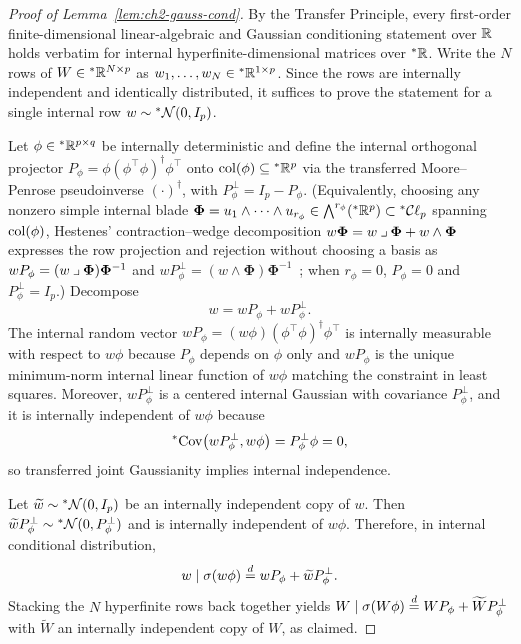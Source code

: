\begin{proof}[Proof of Lemma~\ref{lem:ch2-gauss-cond}]
By the Transfer Principle, every first-order finite-dimensional linear-algebraic and Gaussian conditioning statement over $\mathbb{R}$ holds verbatim for internal hyperfinite-dimensional matrices over ${}^*\mathbb{R}$. Write the $N$ rows of $W \in {}^*\mathbb{R}^{N \times p}$ as $w_1, \dots, w_N \in {}^*\mathbb{R}^{1 \times p}$. Since the rows are internally independent and identically distributed, it suffices to prove the statement for a single internal row $w \sim {}^*\mathcal{N}(0, I_p)$.

Let $\phi \in {}^*\mathbb{R}^{p \times q}$ be internally deterministic and define the internal orthogonal projector $P_\phi = \phi(\phi^\top \phi)^\dagger \phi^\top$ onto $\operatorname{col}(\phi) \subseteq {}^*\mathbb{R}^p$ via the transferred Moore--Penrose pseudoinverse $(\cdot)^\dagger$, with $P_\phi^\perp = I_p - P_\phi$. (Equivalently, choosing any nonzero simple internal blade $\bm{\Phi} = u_1 \wedge \dots \wedge u_{r_\phi} \in \bigwedge^{r_\phi}({}^*\mathbb{R}^p) \subset {}^*\mathcal{C}\ell_p$ spanning $\operatorname{col}(\phi)$, Hestenes' contraction--wedge decomposition $w\bm{\Phi} = w\mathbin{\lrcorner}\bm{\Phi} + w\wedge\bm{\Phi}$ expresses the row projection and rejection without choosing a basis as $w P_\phi = (w\mathbin{\lrcorner}\bm{\Phi})\bm{\Phi}^{-1}$ and $w P_\phi^\perp = (w\wedge\bm{\Phi})\bm{\Phi}^{-1}$~\cite{hestenes1984clifford}; when $r_\phi = 0$, $P_\phi = 0$ and $P_\phi^\perp = I_p$.) Decompose
\begin{equation}
\label{eq:appa-one-sided-decomp}
w = w P_\phi + w P_\phi^\perp.
\end{equation}
The internal random vector $w P_\phi = (w\phi)(\phi^\top \phi)^\dagger \phi^\top$ is internally measurable with respect to $w\phi$ because $P_\phi$ depends on $\phi$ only and $w P_\phi$ is the unique minimum-norm internal linear function of $w\phi$ matching the constraint in least squares. Moreover, $w P_\phi^\perp$ is a centered internal Gaussian with covariance $P_\phi^\perp$, and it is internally independent of $w\phi$ because
\begin{equation}
\label{eq:appa-one-sided-cov}
{}^*\!\operatorname{Cov}\bigl(w P_\phi^\perp, w\phi\bigr) = P_\phi^\perp \phi = 0,
\end{equation}
so transferred joint Gaussianity implies internal independence.

Let $\widetilde{w} \sim {}^*\mathcal{N}(0, I_p)$ be an internally independent copy of $w$. Then $\widetilde{w} P_\phi^\perp \sim {}^*\mathcal{N}(0, P_\phi^\perp)$ and is internally independent of $w\phi$. Therefore, in internal conditional distribution,
\begin{equation}
\label{eq:appa-one-sided-row}
w \mid \sigma(w\phi) \stackrel{d}{=} w P_\phi + \widetilde{w} P_\phi^\perp.
\end{equation}
Stacking the $N$ hyperfinite rows back together yields $W \mid \sigma(W\phi) \stackrel{d}{=} W P_\phi + \widetilde{W} P_\phi^\perp$ with $\widetilde{W}$ an internally independent copy of $W$, as claimed.
\end{proof}

